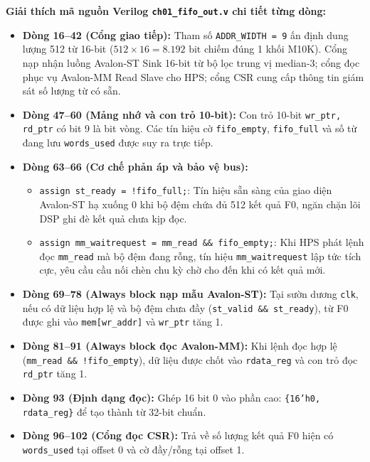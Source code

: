 \textbf{Giải thích mã nguồn Verilog \texttt{ch01\_fifo\_out.v} chi tiết từng dòng:}
\begin{itemize}[leftmargin=1.5em, itemsep=2pt]
    \item \textbf{Dòng 16--42 (Cổng giao tiếp):} Tham số \texttt{ADDR\_WIDTH = 9} ấn định dung lượng 512 từ 16-bit ($512 \times 16 = 8.192\text{ bit}$ chiếm đúng 1 khối M10K). Cổng nạp nhận luồng Avalon-ST Sink 16-bit từ bộ lọc trung vị median-3; cổng đọc phục vụ Avalon-MM Read Slave cho HPS; cổng CSR cung cấp thông tin giám sát số lượng từ có sẵn.
    \item \textbf{Dòng 47--60 (Mảng nhớ và con trỏ 10-bit):} Con trỏ 10-bit \texttt{wr\_ptr, rd\_ptr} có bit 9 là bit vòng. Các tín hiệu cờ \texttt{fifo\_empty}, \texttt{fifo\_full} và số từ đang lưu \texttt{words\_used} được suy ra trực tiếp.
    \item \textbf{Dòng 63--66 (Cơ chế phản áp và bảo vệ bus):} 
    \begin{itemize}[leftmargin=1.2em, itemsep=1pt]
        \item \texttt{assign st\_ready = !fifo\_full;}: Tín hiệu sẵn sàng của giao diện Avalon-ST hạ xuống 0 khi bộ đệm chứa đủ 512 kết quả F0, ngăn chặn lõi DSP ghi đè kết quả chưa kịp đọc.
        \item \texttt{assign mm\_waitrequest = mm\_read \&\& fifo\_empty;}: Khi HPS phát lệnh đọc \texttt{mm\_read} mà bộ đệm đang rỗng, tín hiệu \texttt{mm\_waitrequest} lập tức tích cực, yêu cầu cầu nối chèn chu kỳ chờ cho đến khi có kết quả mới.
    \end{itemize}
    \item \textbf{Dòng 69--78 (Always block nạp mẫu Avalon-ST):} Tại sườn dương \texttt{clk}, nếu có dữ liệu hợp lệ và bộ đệm chưa đầy (\texttt{st\_valid \&\& st\_ready}), từ F0 được ghi vào \texttt{mem[wr\_addr]} và \texttt{wr\_ptr} tăng 1.
    \item \textbf{Dòng 81--91 (Always block đọc Avalon-MM):} Khi lệnh đọc hợp lệ (\texttt{mm\_read \&\& !fifo\_empty}), dữ liệu được chốt vào \texttt{rdata\_reg} và con trỏ đọc \texttt{rd\_ptr} tăng 1.
    \item \textbf{Dòng 93 (Định dạng đọc):} Ghép 16 bit 0 vào phần cao: \texttt{\{16'h0, rdata\_reg\}} để tạo thành từ 32-bit chuẩn.
    \item \textbf{Dòng 96--102 (Cổng đọc CSR):} Trả về số lượng kết quả F0 hiện có \texttt{words\_used} tại offset 0 và cờ đầy/rỗng tại offset 1.
\end{itemize}

